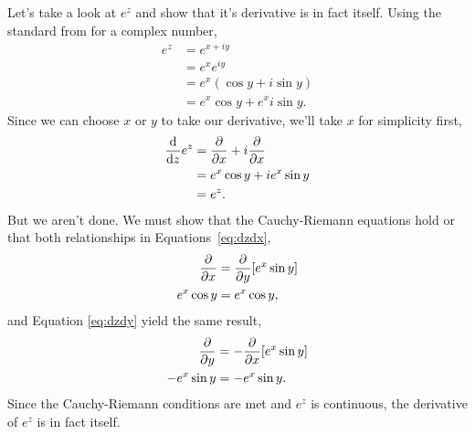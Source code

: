 \documentclass[final,a4paper,12pt]{article}
\theoremstyle{definition}
\begin{document}
Let's take a look at $e^z$ and show that it's derivative is in fact itself.
Using the standard from for a complex number,
\begin{align*}
    e^z &= e^{x + i y} \\
    &= e^x e^{i y} \\
    &= e^x (\cos y + i \sin y) \\
    &= e^x \cos y + e^x i \sin y .
\end{align*}
Since we can choose $x$ or $y$ to take our derivative, we'll take $x$ for
simplicity first,
\begin{align*}
    \dv{}{z} e^z &= \pdv{}{x}(e^x \cos y) + i \pdv{}{x} (e^x \sin y) \\
    &= e^x \cos y + i e^x \sin y \\
    &= e^z .
\end{align*}
But we aren't done.  We must show that the Cauchy-Riemann equations hold or that
both relationships in Equations~\ref{eq:dzdx},
\begin{align*}
    \pdv{}{x} (e^x \cos y) &= \pdv{}{y} [e^x \sin y] \\
    e^x \cos y &= e^x \cos y ,
\end{align*}
and Equation \ref{eq:dzdy} yield the same
result,
\begin{align*}
    \pdv{}{y} (e^x \cos y) &= -\pdv{}{x} [e^x \sin y] \\
    - e^x \sin y &= - e^x \sin y .
\end{align*}
Since the Cauchy-Riemann conditions are met and $e^z$ is continuous, the
derivative of $e^z$ is in fact itself.
\end{document}

